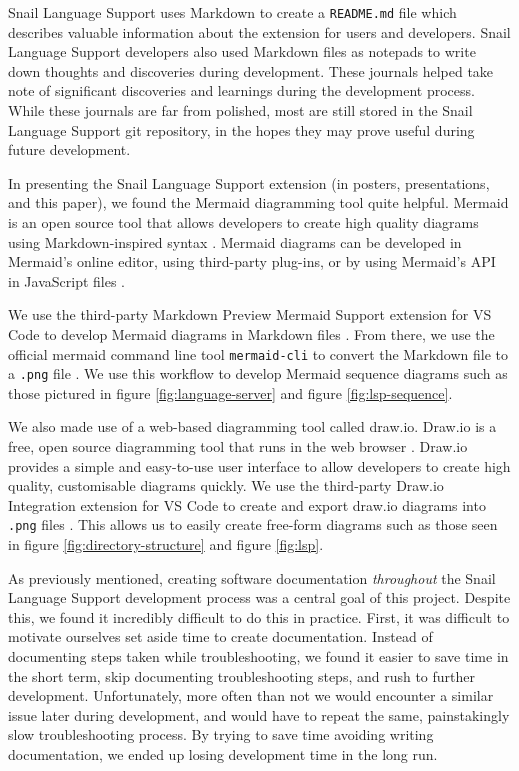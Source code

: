 \documentclass{article}
\begin{document}
Snail Language Support uses Markdown to create a \lstinline{README.md} file which describes valuable information about the extension for users and developers. Snail Language Support developers also used Markdown files as notepads to write down thoughts and discoveries during development. These journals helped take note of significant discoveries and learnings during the development process. While these journals are far from polished, most are still stored in the Snail Language Support git repository, in the hopes they may prove useful during future development. 

In presenting the Snail Language Support extension (in posters, presentations, and this paper), we found the Mermaid diagramming tool quite helpful. Mermaid is an open source tool that allows developers to create high quality diagrams using Markdown-inspired syntax \cite{MermaidJS_2023a}. Mermaid diagrams can be developed in Mermaid's online editor, using third-party plug-ins, or by using Mermaid's API in JavaScript files \cite{MermaidJS_2023b}. 

We use the third-party Markdown Preview Mermaid Support extension for VS Code to develop Mermaid diagrams in Markdown files \cite{Bierner_2023}. From there, we use the official mermaid command line tool \lstinline{mermaid-cli} to convert the Markdown file to a \lstinline{.png} file \cite{MermaidJS_2023c}. We use this workflow to develop Mermaid sequence diagrams such as those pictured in figure \ref{fig:language-server} and figure \ref{fig:lsp-sequence}. 

We also made use of a web-based diagramming tool called draw.io. Draw.io is a free, open source diagramming tool that runs in the web browser \cite{drawio_2023}. Draw.io provides a simple and easy-to-use user interface to allow developers to create high quality, customisable diagrams quickly. We use the third-party Draw.io Integration extension for VS Code to create and export draw.io diagrams into \lstinline{.png} files \cite{Dieterichs_2023}. This allows us to easily create free-form diagrams such as those seen in figure \ref{fig:directory-structure} and figure \ref{fig:lsp}.

As previously mentioned, creating software documentation \emph{throughout} the Snail Language Support development process was a central goal of this project. Despite this, we found it incredibly difficult to do this in practice. First, it was difficult to motivate ourselves set aside time to create documentation. Instead of documenting steps taken while troubleshooting, we found it easier to save time in the short term, skip documenting troubleshooting steps, and rush to further development. Unfortunately, more often than not we would encounter a similar issue later during development, and would have to repeat the same, painstakingly slow troubleshooting process. By trying to save time avoiding writing documentation, we ended up losing development time in the long run. 
\end{document}

